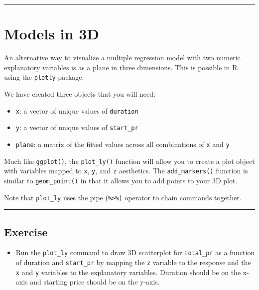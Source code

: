 \documentclass[
]{book}
\providecommand{\tightlist}{%
  \setlength{\itemsep}{0pt}\setlength{\parskip}{0pt}}
\begin{document}
\begin{center}\rule{0.5\linewidth}{0.5pt}\end{center}

\hypertarget{models-in-3d}{%
\section{Models in 3D}\label{models-in-3d}}

An alternative way to visualize a multiple regression model with two numeric explanatory variables is as a plane in three dimensions. This is possible in R using the \texttt{plotly} package.

We have created three objects that you will need:

\begin{itemize}
\tightlist
\item
  \texttt{x}: a vector of unique values of \texttt{duration}
\item
  \texttt{y}: a vector of unique values of \texttt{start\_pr}
\item
  \texttt{plane}: a matrix of the fitted values across all combinations of \texttt{x} and \texttt{y}
\end{itemize}

Much like \texttt{ggplot()}, the \texttt{plot\_ly()} function will allow you to create a plot object with variables mapped to \texttt{x}, \texttt{y}, and \texttt{z} aesthetics. The \texttt{add\_markers()} function is similar to \texttt{geom\_point()} in that it allows you to add points to your 3D plot.

Note that \texttt{plot\_ly} uses the pipe (\texttt{\%\textgreater{}\%)} operator to chain commands together.

\begin{center}\rule{0.5\linewidth}{0.5pt}\end{center}

\hypertarget{exercise-10}{%
\subsection*{Exercise}\label{exercise-10}}

\begin{itemize}
\tightlist
\item
  Run the \texttt{plot\_ly} command to draw 3D scatterplot for \texttt{total\_pr} as a function of duration and \texttt{start\_pr} by mapping the \texttt{z} variable to the response and the \texttt{x} and \texttt{y} variables to the explanatory variables. Duration should be on the x-axis and starting price should be on the y-axis.
\end{itemize}
\end{document}
